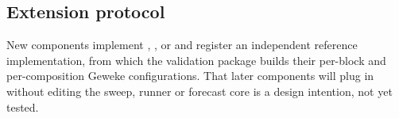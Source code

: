
\subsection{Extension protocol}\label{sec:arch-extension}

New components implement , ,  or  and
register an independent reference implementation, from which the validation package builds their
per-block and per-composition Geweke configurations. %
That later components will plug in without editing the sweep, runner or forecast core is a design
intention, not yet tested. %
